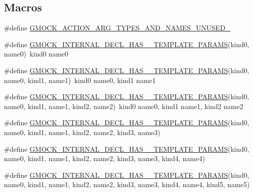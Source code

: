 \subsection*{Macros}
\begin{DoxyCompactItemize}
\item 
\#define \mbox{\hyperlink{googletest-master_2googlemock_2include_2gmock_2gmock-generated-actions_8h_a069f37fdbe36aabe65da6eb6221b9b19}{G\+M\+O\+C\+K\+\_\+\+A\+C\+T\+I\+O\+N\+\_\+\+A\+R\+G\+\_\+\+T\+Y\+P\+E\+S\+\_\+\+A\+N\+D\+\_\+\+N\+A\+M\+E\+S\+\_\+\+U\+N\+U\+S\+E\+D\+\_\+}}
\item 
\#define \mbox{\hyperlink{googletest-master_2googlemock_2include_2gmock_2gmock-generated-actions_8h_a8b8b1a43495f82aefe40c410bc1ce392}{G\+M\+O\+C\+K\+\_\+\+I\+N\+T\+E\+R\+N\+A\+L\+\_\+\+D\+E\+C\+L\+\_\+\+H\+A\+S\+\_\+\_\+\+T\+E\+M\+P\+L\+A\+T\+E\+\_\+\+P\+A\+R\+A\+MS}}(kind0,  name0)~kind0 name0
\item 
\#define \mbox{\hyperlink{googletest-master_2googlemock_2include_2gmock_2gmock-generated-actions_8h_aa238172d277a7ba189a5d481356a6c66}{G\+M\+O\+C\+K\+\_\+\+I\+N\+T\+E\+R\+N\+A\+L\+\_\+\+D\+E\+C\+L\+\_\+\+H\+A\+S\+\_\+\_\+\+T\+E\+M\+P\+L\+A\+T\+E\+\_\+\+P\+A\+R\+A\+MS}}(kind0,  name0,  kind1,  name1)~kind0 name0, kind1 name1
\item 
\#define \mbox{\hyperlink{googletest-master_2googlemock_2include_2gmock_2gmock-generated-actions_8h_ae776d1f23c7b8defac49269c69e64baa}{G\+M\+O\+C\+K\+\_\+\+I\+N\+T\+E\+R\+N\+A\+L\+\_\+\+D\+E\+C\+L\+\_\+\+H\+A\+S\+\_\+\_\+\+T\+E\+M\+P\+L\+A\+T\+E\+\_\+\+P\+A\+R\+A\+MS}}(kind0,  name0,  kind1,  name1,  kind2,  name2)~kind0 name0, kind1 name1, kind2 name2
\item 
\#define \mbox{\hyperlink{googletest-master_2googlemock_2include_2gmock_2gmock-generated-actions_8h_a19b48575600b1a046c3f77d5dfc124ba}{G\+M\+O\+C\+K\+\_\+\+I\+N\+T\+E\+R\+N\+A\+L\+\_\+\+D\+E\+C\+L\+\_\+\+H\+A\+S\+\_\+\_\+\+T\+E\+M\+P\+L\+A\+T\+E\+\_\+\+P\+A\+R\+A\+MS}}(kind0,  name0,  kind1,  name1,  kind2,  name2,  kind3,  name3)
\item 
\#define \mbox{\hyperlink{googletest-master_2googlemock_2include_2gmock_2gmock-generated-actions_8h_aef0f11711d63f65561ce5a4d032673f8}{G\+M\+O\+C\+K\+\_\+\+I\+N\+T\+E\+R\+N\+A\+L\+\_\+\+D\+E\+C\+L\+\_\+\+H\+A\+S\+\_\+\_\+\+T\+E\+M\+P\+L\+A\+T\+E\+\_\+\+P\+A\+R\+A\+MS}}(kind0,  name0,  kind1,  name1,  kind2,  name2,  kind3,  name3,  kind4,  name4)
\item 
\#define \mbox{\hyperlink{googletest-master_2googlemock_2include_2gmock_2gmock-generated-actions_8h_a4c90362350df0faa6e866642f44708fe}{G\+M\+O\+C\+K\+\_\+\+I\+N\+T\+E\+R\+N\+A\+L\+\_\+\+D\+E\+C\+L\+\_\+\+H\+A\+S\+\_\+\_\+\+T\+E\+M\+P\+L\+A\+T\+E\+\_\+\+P\+A\+R\+A\+MS}}(kind0,  name0,  kind1,  name1,  kind2,  name2,  kind3,  name3,  kind4,  name4,  kind5,  name5)

\end{DoxyCompactItemize}
